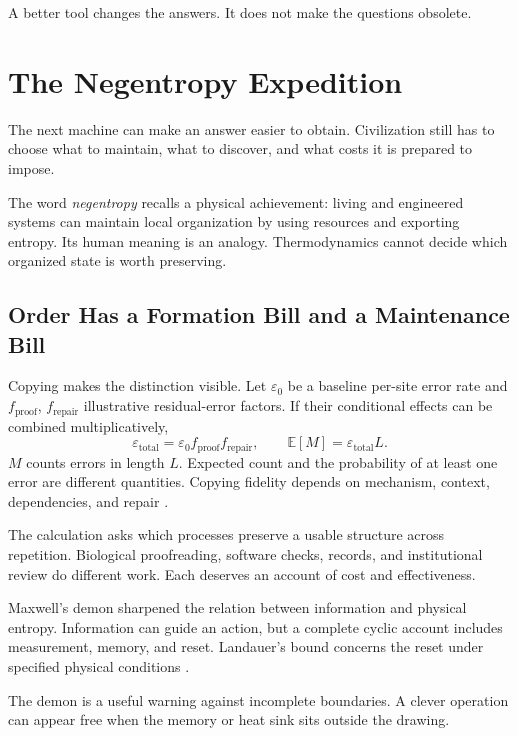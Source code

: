 \documentclass[11pt,openany]{book}
\begin{document}
A better tool changes the answers. It does not make the questions obsolete.

\section{The Negentropy Expedition}

The next machine can make an answer easier to obtain. Civilization still has to choose what to maintain, what to discover, and what costs it is prepared to impose.

The word \emph{negentropy} recalls a physical achievement: living and engineered systems can maintain local organization by using resources and exporting entropy. Its human meaning is an analogy. Thermodynamics cannot decide which organized state is worth preserving.

\subsection{Order Has a Formation Bill and a Maintenance Bill}

Copying makes the distinction visible. Let $\varepsilon_0$ be a baseline per-site error rate and $f_{\mathrm{proof}}$, $f_{\mathrm{repair}}$ illustrative residual-error factors. If their conditional effects can be combined multiplicatively,
\begin{equation}
 \varepsilon_{\mathrm{total}}
 =\varepsilon_0f_{\mathrm{proof}}f_{\mathrm{repair}},
 \qquad
 \mathbb E[M]=\varepsilon_{\mathrm{total}}L.
\end{equation}
$M$ counts errors in length $L$. Expected count and the probability of at least one error are different quantities. Copying fidelity depends on mechanism, context, dependencies, and repair \cite{kunkel2000dna}.

The calculation asks which processes preserve a usable structure across repetition. Biological proofreading, software checks, records, and institutional review do different work. Each deserves an account of cost and effectiveness.

Maxwell's demon sharpened the relation between information and physical entropy. Information can guide an action, but a complete cyclic account includes measurement, memory, and reset. Landauer's bound concerns the reset under specified physical conditions \cite{landauer1961,bennett1982thermodynamics}.

The demon is a useful warning against incomplete boundaries. A clever operation can appear free when the memory or heat sink sits outside the drawing.
\end{document}
